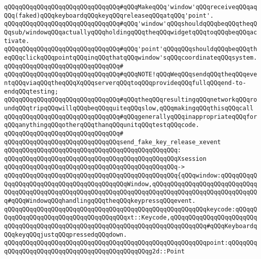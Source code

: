 \newline
\verb|qQQqqQQqqQQqqQQqqQQqqQQqqQQqqQQq#qQQqMakeqQQq'window'qQQqreceiveqQQqaqQQq(faked)qQQqkeyboardqQQqkeyqQQqreleaseqQQqatqQQq'point'.|\newline
\verb|qQQqqQQqqQQqqQQqqQQqqQQqqQQqqQQq#qQQq'window'qQQqshouldqQQqbeqQQqtheqQQqsub/windowqQQqactuallyqQQqholdingqQQqtheqQQqwidgetqQQqtoqQQqbeqQQqactivate.|\newline
\verb|qQQqqQQqqQQqqQQqqQQqqQQqqQQqqQQq#qQQq'point'qQQqqQQqshouldqQQqbeqQQqtheqQQqclickqQQqpointqQQqinqQQqthatqQQqwindow'sqQQqcoordinateqQQqsystem.|\newline
\verb|qQQqqQQqqQQqqQQqqQQqqQQqqQQqqQQq#|\newline
\verb|qQQqqQQqqQQqqQQqqQQqqQQqqQQqqQQq#qQQqNOTE!qQQqWeqQQqsendqQQqtheqQQqeventqQQqviaqQQqtheqQQqXqQQqserverqQQqtoqQQqprovideqQQqfullqQQqend-to-endqQQqtesting;|\newline
\verb|qQQqqQQqqQQqqQQqqQQqqQQqqQQqqQQq#qQQqtheqQQqresultingqQQqnetworkqQQqroundqQQqtripqQQqwillqQQqbeqQQqquiteqQQqslow,qQQqmakingqQQqthisqQQqcall|\newline
\verb|qQQqqQQqqQQqqQQqqQQqqQQqqQQqqQQq#qQQqgenerallyqQQqinappropriateqQQqforqQQqanythingqQQqotherqQQqthanqQQqunitqQQqtestqQQqcode.|\newline
\verb|qQQqqQQqqQQqqQQqqQQqqQQqqQQqqQQq#|\newline
\verb|qQQqqQQqqQQqqQQqqQQqqQQqqQQqqQQqsend_fake_key_release_xevent|\newline
\verb|qQQqqQQqqQQqqQQqqQQqqQQqqQQqqQQqqQQqqQQqqQQqqQQq:|\newline
\verb|qQQqqQQqqQQqqQQqqQQqqQQqqQQqqQQqqQQqqQQqqQQqqQQqXsession|\newline
\verb|qQQqqQQqqQQqqQQqqQQqqQQqqQQqqQQqqQQqqQQqqQQqqQQq->|\newline
\verb|qQQqqQQqqQQqqQQqqQQqqQQqqQQqqQQqqQQqqQQqqQQqqQQq{qQQqwindow:qQQqqQQqqQQqqQQqqQQqqQQqqQQqqQQqqQQqqQQqqQQqWindow,qQQqqQQqqQQqqQQqqQQqqQQqqQQqqQQqqQQqqQQqqQQqqQQqqQQqqQQqqQQqqQQqqQQqqQQqqQQqqQQqqQQqqQQqqQQqqQQqqQQq#qQQqWindowqQQqhandlingqQQqtheqQQqkeypressqQQqevent.|\newline
\verb|qQQqqQQqqQQqqQQqqQQqqQQqqQQqqQQqqQQqqQQqqQQqqQQqqQQqqQQqkeycode:qQQqqQQqqQQqqQQqqQQqqQQqqQQqqQQqqQQqqQQqxt::Keycode,qQQqqQQqqQQqqQQqqQQqqQQqqQQqqQQqqQQqqQQqqQQqqQQqqQQqqQQqqQQqqQQqqQQqqQQqqQQqqQQq#qQQqKeyboardqQQqkeyqQQqjustqQQqpressedqQQqdown.|\newline
\verb|qQQqqQQqqQQqqQQqqQQqqQQqqQQqqQQqqQQqqQQqqQQqqQQqqQQqqQQqpoint:qQQqqQQqqQQqqQQqqQQqqQQqqQQqqQQqqQQqqQQqqQQqqQQqg2d::Point|\newline
